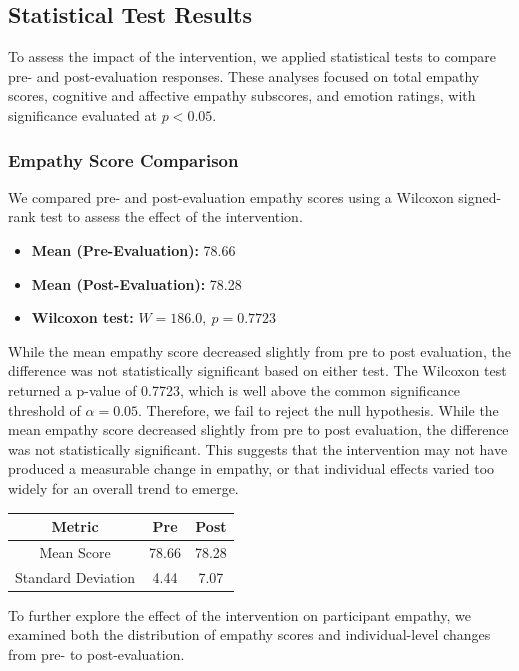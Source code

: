 \subsection{Statistical Test Results}

To assess the impact of the intervention, we applied statistical tests to compare pre- and post-evaluation responses. These analyses focused on total empathy scores, cognitive and affective empathy subscores, and emotion ratings, with significance evaluated at $p < 0.05$.


\subsubsection{Empathy Score Comparison}

We compared pre- and post-evaluation empathy scores using a Wilcoxon signed-rank test to assess the effect of the intervention.

\begin{itemize}
  \item \textbf{Mean (Pre-Evaluation):} 78.66
  \item \textbf{Mean (Post-Evaluation):} 78.28
  \item \textbf{Wilcoxon test:} $W = 186.0,\ p = 0.7723$
\end{itemize}

While the mean empathy score decreased slightly from pre to post evaluation, the difference was not statistically significant based on either test. The Wilcoxon test returned a p-value of 0.7723, which is well above the common significance threshold of $\alpha = 0.05$. Therefore, we fail to reject the null hypothesis. While the mean empathy score decreased slightly from pre to post evaluation, the difference was not statistically significant. This suggests that the intervention may not have produced a measurable change in empathy, or that individual effects varied too widely for an overall trend to emerge.


\begin{center}
\begin{tabular}{|c|c|c|}
\hline
\textbf{Metric} & \textbf{Pre} & \textbf{Post} \\
\hline
Mean Score & 78.66 & 78.28 \\
Standard Deviation & 4.44 & 7.07 \\
\hline
\end{tabular}
\end{center}

To further explore the effect of the intervention on participant empathy, we examined both the distribution of empathy scores and individual-level changes from pre- to post-evaluation.

